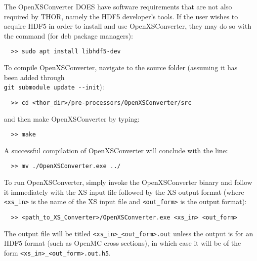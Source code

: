 The OpenXSConverter DOES have software requirements that are not also required by \ac{THOR}, namely the HDF5 developer's tools.
If the user wishes to acquire HDF5 in order to install and use OpenXSConverter, they may do so with the command (for deb package managers):
\begin{verbatim}
  >> sudo apt install libhdf5-dev
\end{verbatim}
To compile OpenXSConverter, navigate to the source folder (assuming it has been added through \\
\verb"git submodule update --init"):
\begin{verbatim}
  >> cd <thor_dir>/pre-processors/OpenXSConverter/src
\end{verbatim}
and then make OpenXSConverter by typing:
\begin{verbatim}
  >> make
\end{verbatim}
A successful compilation of OpenXSConverter will conclude with the line:
\begin{verbatim}
  >> mv ./OpenXSConverter.exe ../
\end{verbatim}

To run OpenXSConverter, simply invoke the OpenXSConverter binary and follow it immediately with the XS input file followed by the XS output format (where \verb"<xs_in>" is the name of the XS input file and \verb"<out_form>" is the output format):
\begin{verbatim}
  >> <path_to_XS_Converter>/OpenXSConverter.exe <xs_in> <out_form>
\end{verbatim}
The output file will be titled \verb"<xs_in>_<out_form>.out" unless the output is for an HDF5 format (such as OpenMC cross sections), in which case it will be of the form \verb"<xs_in>_<out_form>.out.h5".


